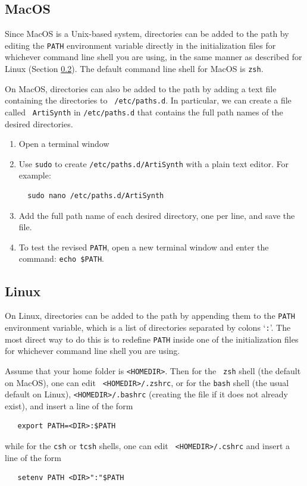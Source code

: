 \documentclass{article}
\begin{document}
\subsection{MacOS}

Since MacOS is a Unix-based system, directories can be added to the
path by editing the {\tt PATH} environment variable directly in the
initialization files for whichever command line shell you are using,
in the same manner as described for Linux (Section \ref{Linux}).
The default command line shell for MacOS is {\tt zsh}.

On MacOS, directories can also be added to the
path by adding a text file containing the directories to {\tt
/etc/paths.d}.  In particular, we can create a file called {\tt
ArtiSynth} in {\tt /etc/paths.d} that contains the full path names of
the desired directories.

\begin{enumerate}

\item Open a terminal window

\item Use {\tt sudo} to create {\tt /etc/paths.d/ArtiSynth} with a plain
text editor. For example:
\begin{verbatim}
  sudo nano /etc/paths.d/ArtiSynth
\end{verbatim}

\item Add the full path name of each desired directory, one per line,
and save the file.

\item To test the revised {\tt PATH}, open a new terminal
window and enter the command: {\tt echo \$PATH}.

\end{enumerate}

\subsection{Linux}
\label{Linux}

On Linux, directories can be added to the path by appending them to
the {\tt PATH} environment variable, which is a list of directories
separated by colons `{\tt :}'. The most direct way to do this is to
redefine {\tt PATH} inside one of the initialization files for
whichever command line shell you are using.

Assume that your home folder is {\tt <HOMEDIR>}. Then for the {\tt
zsh} shell (the default on MacOS), one can edit {\tt
<HOMEDIR>/.zshrc}, or for the {\tt bash} shell (the usual default on
Linux), {\tt <HOMEDIR>/.bashrc} (creating the file if it does not
already exist), and insert a line of the form
\begin{verbatim}
   export PATH=<DIR>:$PATH
\end{verbatim}
while for the {\tt csh} or {\tt tcsh} shells, one can edit {\tt
<HOMEDIR>/.cshrc} and insert a line of the form
\begin{verbatim}
   setenv PATH <DIR>":"$PATH
\end{verbatim}
\end{document}
